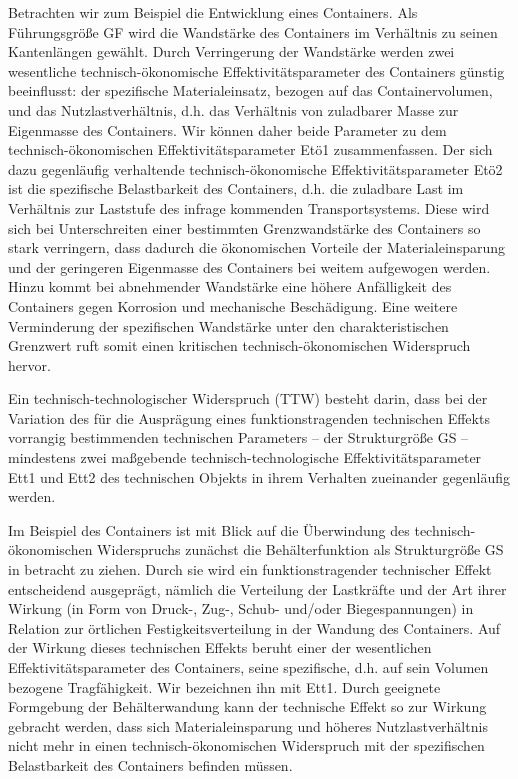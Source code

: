 \documentclass[12pt,a4paper]{article}
\begin{document}
Betrachten wir zum Beispiel die Entwicklung eines Containers. Als Führungsgröße
GF wird die Wandstärke des Containers im Verhältnis zu seinen Kantenlängen
gewählt. Durch Verringerung der Wandstärke werden zwei wesentliche
technisch-ökonomische Effektivitätsparameter des Containers günstig
beeinflusst: der spezifische Materialeinsatz, bezogen auf das Containervolumen,
und das Nutzlastverhältnis, d.h. das Verhältnis von zuladbarer Masse zur
Eigenmasse des Containers. Wir können daher beide Parameter zu dem
technisch-ökonomischen Effektivitätsparameter Etö1 zusammenfassen. Der sich
dazu gegenläufig verhaltende technisch-ökonomische Effektivitätsparameter Etö2
ist die spezifische Belastbarkeit des Containers, d.h. die zuladbare Last im
Verhältnis zur Laststufe des infrage kommenden Transportsystems. Diese wird
sich bei Unterschreiten einer bestimmten Grenzwandstärke des Containers so
stark verringern, dass dadurch die ökonomischen Vorteile der Materialeinsparung
und der geringeren Eigenmasse des Containers bei weitem aufgewogen werden.
Hinzu kommt bei abnehmender Wandstärke eine höhere Anfälligkeit des Containers
gegen Korrosion und mechanische Beschädigung. Eine weitere Verminderung der
spezifischen Wandstärke unter den charakteristischen Grenzwert ruft somit einen
kritischen technisch-ökonomischen Widerspruch hervor.

Ein technisch-technologischer Widerspruch (TTW) besteht darin, dass bei der
Variation des für die Ausprägung eines funktionstragenden technischen Effekts
vorrangig bestimmenden technischen Parameters – der Strukturgröße GS –
mindestens zwei maßgebende technisch-technologische Effektivitätsparameter Ett1
und Ett2 des technischen Objekts in ihrem Verhalten zueinander gegenläufig
werden.

Im Beispiel des Containers ist mit Blick auf die Überwindung des
technisch-ökonomischen Widerspruchs zunächst die Behälterfunktion als
Strukturgröße GS in betracht zu ziehen. Durch sie wird ein funktionstragender
technischer Effekt entscheidend ausgeprägt, nämlich die Verteilung der
Lastkräfte und der Art ihrer Wirkung (in Form von Druck-, Zug-, Schub- und/oder
Biegespannungen) in Relation zur örtlichen Festigkeitsverteilung in der Wandung
des Containers. Auf der Wirkung dieses technischen Effekts beruht einer der
wesentlichen Effektivitätsparameter des Containers, seine spezifische, d.h. auf
sein Volumen bezogene Tragfähigkeit. Wir bezeichnen ihn mit Ett1. Durch
geeignete Formgebung der Behälterwandung kann der technische Effekt so zur
Wirkung gebracht werden, dass sich Materialeinsparung und höheres
Nutzlastverhältnis nicht mehr in einen technisch-ökonomischen Widerspruch mit
der spezifischen Belastbarkeit des Containers befinden müssen.
\end{document}
